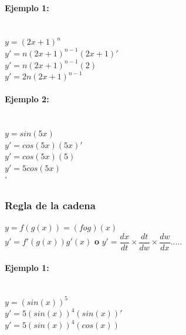 \documentclass[stu, 12pt, a4paper, donotrepeattitle, floatsintext, natbib]{apa7}
\begin{document}
    \paragraph{Ejemplo 1:}\\[0.5cm]
    $y=(2x+1)^n$\\[0.5cm]
    $y'=n(2x+1)^{n-1}(2x+1)'$\\[0.5cm]
    $y'=n(2x+1)^{n-1}(2)$\\[0.5cm]
    $y'=2n(2x+1)^{n-1}$\\[0.5cm]
    \paragraph{Ejemplo 2:}\\[0.5cm]
    $y=sin(5x)$\\[0.5cm]
    $y'=cos(5x)(5x)'$\\[0.5cm]
    $y'=cos(5x)(5)$\\[0.5cm]
    $y'=5cos(5x)$\\[0.5cm]'

    \subsubsection{Regla de la cadena}
    $y=f(g(x)) =(fog)(x)$\\[0.5cm]
    $y'=f'(g(x))g'(x)$ \textbf{o} $y'=\dfrac{dx}{dt} \times \dfrac{dt}{dw} \times \dfrac{dw}{dx}$.....\\[0.5cm]

    \paragraph{Ejemplo 1:}\\[0.5cm]
    $y=(sin(x))^5$\\[0.5cm]
    $y'=5(sin(x))^4(sin(x))'$\\[0.5cm]
    $y'=5(sin(x))^4(cos(x))$\\[0.5cm]
    \renewcommand\refname{\large\textbf{Referencias}}
%    
    
\end{document}
